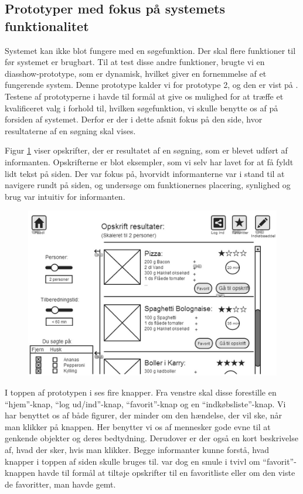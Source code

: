 \subsection{Prototyper med fokus på systemets funktionalitet}
\label{subsec:prototype2}

Systemet kan ikke blot fungere med en søgefunktion. Der skal flere funktioner til før systemet er brugbart. Til at test disse andre funktioner, brugte vi en diasshow-prototype, som er dynamisk, hvilket giver en fornemmelse af et fungerende system. Denne prototype kalder vi for prototype 2, og den er vist på . Testene af prototyperne i  havde til formål at give os mulighed for at træffe et kvalificeret valg i forhold til, hvilken søgefunktion, vi skulle benytte os af på forsiden af systemet. Derfor er der i dette afsnit fokus på den side, hvor resultaterne af en søgning skal vises.

Figur \ref{fig:prototype2design} viser opskrifter, der er resultatet af en søgning, som er blevet udført af informanten. Opskrifterne er blot eksempler, som vi selv har lavet for at få fyldt lidt tekst på siden. Der var fokus på, hvorvidt informanterne var i stand til at navigere rundt på siden, og undersøge om funktionernes placering, synlighed og brug var intuitiv for informanten.

\begin{figure}[H]
	\centering
	\includegraphics[scale=0.7]{billeder/prototyper/prototype2.png}
	\label{fig:prototype2design}
\end{figure}

I toppen af prototypen i  ses fire knapper. Fra venstre skal disse forestille en ``hjem''-knap, ``log ud/ind''-knap, ``favorit''-knap og en ``indkøbsliste''-knap. Vi har benyttet os af både figurer, der minder om den hændelse, der vil ske, når man klikker på knappen. Her benytter vi os af mennesker gode evne til at genkende objekter og deres bedtydning.\cite[p. ~340]{deb} Derudover er der også en kort beskrivelse af, hvad der sker, hvis man klikker. Begge informanter kunne forstå, hvad knapper i toppen af siden skulle bruges til. \Informantet{} var dog en smule i tvivl om ``favorit''-knappen havde til formål at tiltøje opskrifter til en favoritliste eller om den viste de favoritter, man havde gemt.

